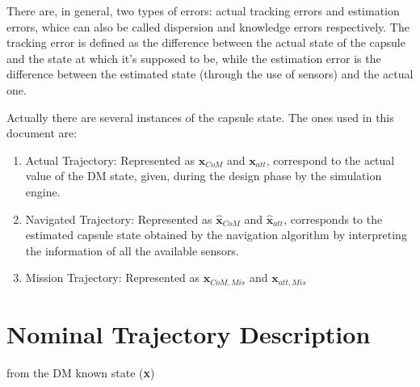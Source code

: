 There are, in general, two types of errors: actual tracking errors and estimation
errors, whice can also be called dispersion and knowledge errors respectively.
The tracking error is defined as the difference between the actual state of the capsule and the state
at which it's supposed to be, while the estimation error is the difference between the estimated state
(through the use of sensors) and the actual one.

Actually there are several instances of the capsule state. The ones used in this document are:

\begin{enumerate}
    \item Actual Trajectory: Represented as $\textbf{x}_{CoM}$ and $\textbf{x}_{att}$, correspond
    to the actual value of the DM state, given, during the design phase by the simulation engine.
    \item Navigated Trajectory: Represented as $\hat{\textbf{x}}_{CoM}$ and $\hat{\textbf{x}}_{att}$,
    corresponds to the estimated capsule state obtained by the navigation algorithm by interpreting the
    information of all the available sensors.
    \item Mission Trajectory: Represented as $\textbf{x}_{CoM,Mis}$ and $\textbf{x}_{att,Mis}$
\end{enumerate}

\newpage

\section{Nominal Trajectory Description}

from the DM known state (\textbf{x})